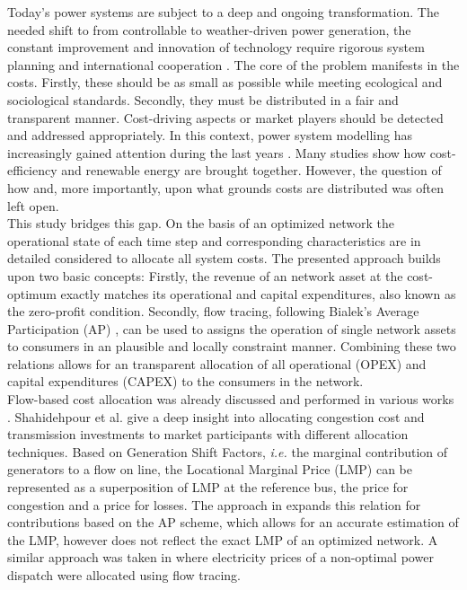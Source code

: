 \documentclass[11pt,twocolumn]{article}
\newcommand{\ie}{\textit{i.e.} }
\begin{document}
Today's power systems are subject to a deep and ongoing transformation. The needed shift to from controllable to weather-driven power generation, the constant improvement and innovation of technology require rigorous system planning and international cooperation \cite{pfenninger_energy_2014,schlachtberger_benefits_2017}. The core of the problem manifests in the costs. Firstly, these should be as small as possible while meeting ecological and sociological standards. Secondly, they must be distributed in a fair and transparent manner. Cost-driving aspects or market players should be detected and addressed appropriately. 
In this context, power system modelling has increasingly gained attention during the last years \cite{pfenninger_energy_2014,bazmi_sustainable_2011,pereira_generation_2017}. Many studies show how cost-efficiency and renewable energy are brought together. However, the question of how and, more importantly, upon what grounds costs are distributed was often left open. \\
This study bridges this gap. On the basis of an optimized network the operational state of each time step and corresponding characteristics are in detailed considered to allocate all system costs. The presented approach builds upon two basic concepts: Firstly, the revenue of an network asset at the cost-optimum exactly matches its operational and capital expenditures, also known as the zero-profit condition. Secondly, flow tracing, following Bialek's Average Participation (AP) \cite{bialek_tracing_1996}, can be used to assigns the operation of single network assets to consumers in an plausible and locally constraint manner. 
Combining these two relations allows for an transparent allocation of all operational (OPEX) and capital expenditures (CAPEX) to the consumers in the network. \\
Flow-based cost allocation was already discussed and performed in various works \cite{galiana_transmission_2003,shahidehpour_market_2002,meng_investigation_2007,tranberg_flow-based_2018,nikoukar_transmission_2012,arabali_pricing_2012,wu_locational_2005}. Shahidehpour et al. give a deep insight into allocating congestion cost and transmission investments to market participants \cite{shahidehpour_market_2002} with different allocation techniques. Based on Generation Shift Factors, \ie the marginal contribution of generators to a flow on line, the Locational Marginal Price (LMP) can be represented as a superposition of LMP at the reference bus, the price for congestion and a price for losses. The approach in \cite{meng_investigation_2007} expands this relation for contributions based on the AP scheme, which allows for an accurate estimation of the LMP, however does not reflect the exact LMP of an optimized network. A similar approach was taken in \cite{tranberg_flow-based_2018} where electricity prices of a non-optimal power dispatch were allocated using flow tracing. 
\end{document}
